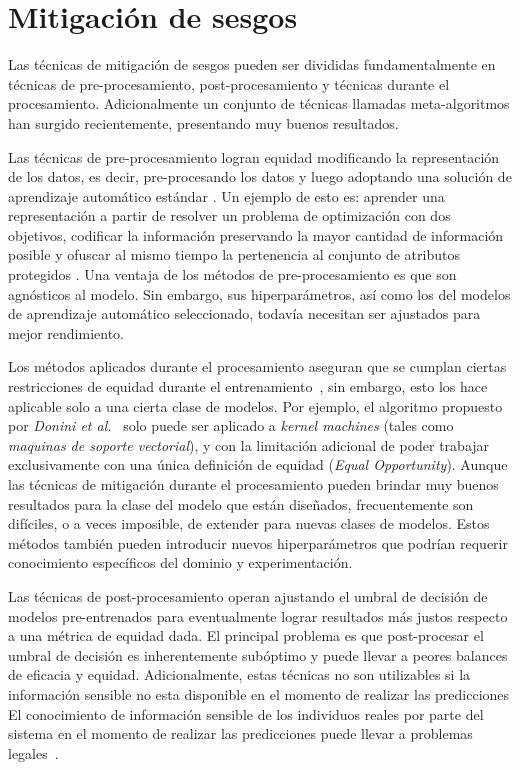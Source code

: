 \section{Mitigación de sesgos}\label{section:mitigation}


Las técnicas de mitigación de sesgos pueden ser divididas fundamentalmente en técnicas de pre-procesamiento, post-procesamiento y técnicas durante el procesamiento. Adicionalmente un conjunto de técnicas llamadas meta-algoritmos han surgido recientemente, presentando muy buenos resultados.

Las técnicas de pre-procesamiento logran equidad modificando la representación de los datos, es decir, pre-procesando los datos y luego adoptando una solución de aprendizaje automático estándar \parencite{nips2017preproc, Kamiran2011DataPT, zemel2013learning}.
Un ejemplo de esto es: aprender una representación a partir de resolver un problema de optimización con dos objetivos, codificar la información preservando la mayor cantidad de información posible y ofuscar al mismo tiempo la pertenencia al conjunto de atributos protegidos \parencite{zemel2013learning}.
Una ventaja de los métodos de pre-procesamiento es que son agnósticos al modelo.
Sin embargo, sus hiperparámetros, así como los del modelos de aprendizaje automático seleccionado, todavía necesitan ser ajustados para mejor rendimiento.

Los métodos aplicados durante el procesamiento aseguran que se cumplan ciertas restricciones de equidad durante el entrenamiento~\parencite{donini2018empirical, zafar2017fairness, zafar2019fairness}, sin embargo, esto los hace aplicable solo a una cierta clase de modelos.
Por ejemplo, el algoritmo propuesto por \emph{Donini et al.}~\parencite{donini2018empirical} solo puede ser aplicado a \emph{kernel machines} (tales como \emph{maquinas de soporte vectorial}), y con la limitación adicional de poder trabajar exclusivamente con una única definición de equidad (\emph{Equal Opportunity}).
Aunque las técnicas de mitigación durante el procesamiento pueden brindar muy buenos resultados para la clase del modelo que están diseñados, frecuentemente son difíciles, o a veces imposible, de extender para nuevas clases de modelos.
Estos métodos también pueden introducir nuevos hiperparámetros que podrían requerir conocimiento específicos del dominio y experimentación.

Las técnicas de post-procesamiento operan ajustando el umbral de decisión de modelos pre-entrenados para eventualmente lograr resultados más justos respecto a una métrica de equidad dada.
El principal problema es que post-procesar el umbral de decisión es inherentemente subóptimo y puede llevar a peores balances de eficacia y equidad.
Adicionalmente, estas técnicas no son utilizables si la información sensible no esta disponible en el momento de realizar las predicciones
El conocimiento de información sensible de los individuos reales por parte del sistema en el momento de realizar las predicciones puede llevar a problemas legales~\parencite{MacCarthy2018StandardsOF}.

